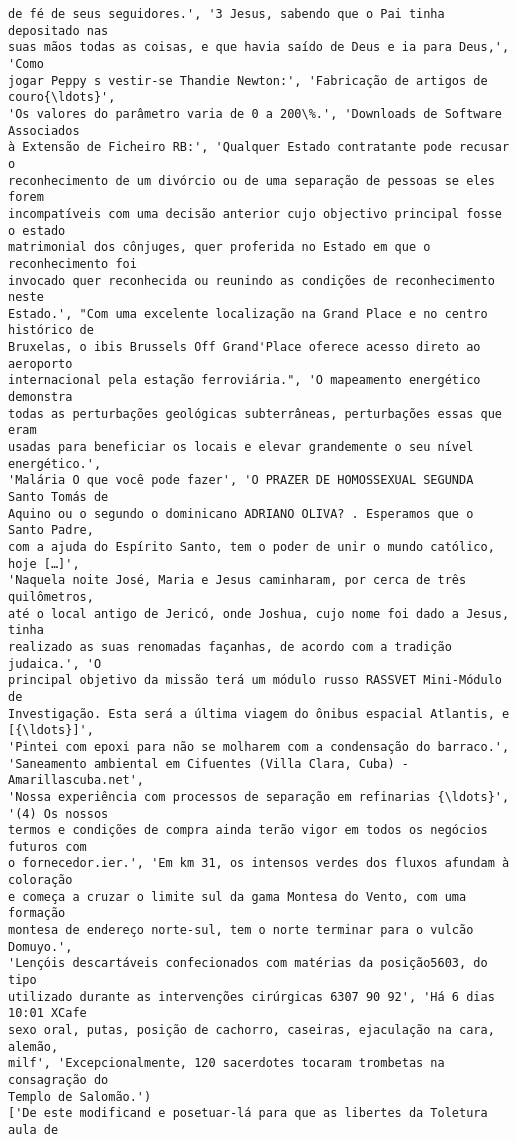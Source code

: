 \documentclass[10pt]{article}
\begin{document}
\begin{Verbatim}[commandchars=\\\{\}]
de fé de seus seguidores.', '3 Jesus, sabendo que o Pai tinha depositado nas
suas mãos todas as coisas, e que havia saído de Deus e ia para Deus,', 'Como
jogar Peppy s vestir-se Thandie Newton:', 'Fabricação de artigos de couro{\ldots}',
'Os valores do parâmetro varia de 0 a 200\%.', 'Downloads de Software Associados
à Extensão de Ficheiro RB:', 'Qualquer Estado contratante pode recusar o
reconhecimento de um divórcio ou de uma separação de pessoas se eles forem
incompatíveis com uma decisão anterior cujo objectivo principal fosse o estado
matrimonial dos cônjuges, quer proferida no Estado em que o reconhecimento foi
invocado quer reconhecida ou reunindo as condições de reconhecimento neste
Estado.', "Com uma excelente localização na Grand Place e no centro histórico de
Bruxelas, o ibis Brussels Off Grand'Place oferece acesso direto ao aeroporto
internacional pela estação ferroviária.", 'O mapeamento energético demonstra
todas as perturbações geológicas subterrâneas, perturbações essas que eram
usadas para beneficiar os locais e elevar grandemente o seu nível energético.',
'Malária O que você pode fazer', 'O PRAZER DE HOMOSSEXUAL SEGUNDA Santo Tomás de
Aquino ou o segundo o dominicano ADRIANO OLIVA? . Esperamos que o Santo Padre,
com a ajuda do Espírito Santo, tem o poder de unir o mundo católico, hoje […]',
'Naquela noite José, Maria e Jesus caminharam, por cerca de três quilômetros,
até o local antigo de Jericó, onde Joshua, cujo nome foi dado a Jesus, tinha
realizado as suas renomadas façanhas, de acordo com a tradição judaica.', 'O
principal objetivo da missão terá um módulo russo RASSVET Mini-Módulo de
Investigação. Esta será a última viagem do ônibus espacial Atlantis, e [{\ldots}]',
'Pintei com epoxi para não se molharem com a condensação do barraco.',
'Saneamento ambiental em Cifuentes (Villa Clara, Cuba) - Amarillascuba.net',
'Nossa experiência com processos de separação em refinarias {\ldots}', '(4) Os nossos
termos e condições de compra ainda terão vigor em todos os negócios futuros com
o fornecedor.ier.', 'Em km 31, os intensos verdes dos fluxos afundam à coloração
e começa a cruzar o limite sul da gama Montesa do Vento, com uma formação
montesa de endereço norte-sul, tem o norte terminar para o vulcão Domuyo.',
'Lençóis descartáveis confecionados com matérias da posição5603, do tipo
utilizado durante as intervenções cirúrgicas 6307 90 92', 'Há 6 dias 10:01 XCafe
sexo oral, putas, posição de cachorro, caseiras, ejaculação na cara, alemão,
milf', 'Excepcionalmente, 120 sacerdotes tocaram trombetas na consagração do
Templo de Salomão.')
['De este modificand e posetuar-lá para que as libertes da Toletura aula de

\end{Verbatim}
\end{document}
